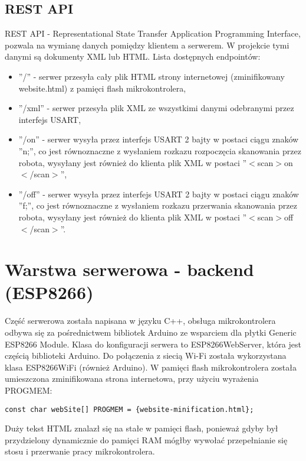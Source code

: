 \documentclass[a4paper,12pt,twoside,openany]{report}
\begin{document}
\subsection{REST API}

REST API - Representational State Transfer Application Programming Interface, pozwala na wymianę danych pomiędzy klientem a serwerem. W projekcie tymi danymi są dokumenty XML lub HTML. Lista dostępnych endpointów:
\begin{itemize}
\item ''/'' - serwer przesyła cały plik HTML strony internetowej (zminifikowany website.html) z pamięci flash mikrokontrolera,
\item ''/xml'' - serwer przesyła plik XML ze wszystkimi danymi odebranymi przez interfejs USART,
\item ''/on'' - serwer wysyła przez interfejs USART 2 bajty w postaci ciągu znaków ''n;'', co jest równoznaczne z wysłaniem rozkazu rozpoczęcia skanowania przez robota, wysyłany jest również do klienta plik XML w postaci ''$<$scan$>$on$<$/scan$>$'',
\item ''/off'' - serwer wysyła przez interfejs USART 2 bajty w postaci ciągu znaków ''f;'', co jest równoznaczne z wysłaniem rozkazu przerwania skanowania przez robota, wysyłany jest również do klienta plik XML w postaci ''$<$scan$>$off$<$/scan$>$''.
\end{itemize}

\section{Warstwa serwerowa - backend (ESP8266)}

Część serwerowa została napisana w języku C++, obsługa mikrokontrolera odbywa się za pośrednictwem bibliotek Arduino ze wsparciem dla płytki Generic ESP8266 Module. Klasa do konfiguracji serwera to ESP8266WebServer, która jest częścią biblioteki Arduino. Do połączenia z siecią Wi-Fi została wykorzystana klasa ESP8266WiFi (również Arduino). W pamięci flash mikrokontrolera została umieszczona zminifikowana strona internetowa, przy użyciu wyrażenia PROGMEM:
\begin{lstlisting}[style=customcpp]
const char webSite[] PROGMEM = {website-minification.html};
\end{lstlisting}
Duży tekst HTML znalazł się na stałe w pamięci flash, ponieważ gdyby był przydzielony dynamicznie do pamięci RAM mógłby wywołać przepełnianie się stosu i przerwanie pracy mikrokontrolera. 
\end{document}
